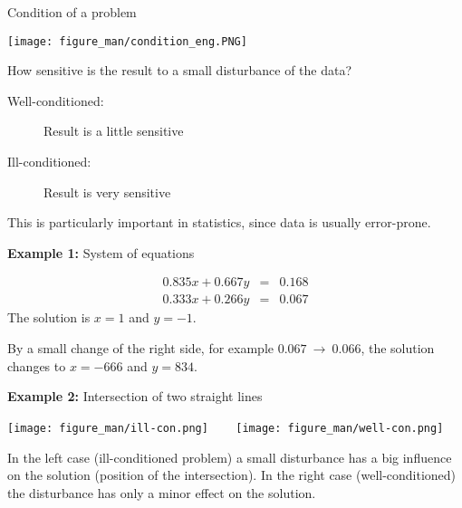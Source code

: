 \documentclass[11pt,compress,t,notes=noshow, xcolor=table]{beamer}
\begin{document}
\begin{vbframe}{Condition of a problem}

\begin{center}
\texttt{[image: figure\_man/condition\_eng.PNG]}
\end{center}

How sensitive is the result to a small disturbance of the data?

\begin{description}
 \item[Well-conditioned:] Result is a little sensitive
 \item[Ill-conditioned:] Result is very sensitive
\end{description}

This is particularly important in statistics, since data is usually error-prone.

%
%
%

\framebreak

\textbf{Example 1: }System of equations

\begin{eqnarray*}
0.835x + 0.667y &=& 0.168 \\
0.333x + 0.266y &=& 0.067
\end{eqnarray*}
The solution is $x = 1$ and $y = -1$.

\lz

By a small change of the right side, for example $0.067~\to~0.066$, the solution changes to
$x = -666$ and $y = 834$.

\framebreak

\textbf{Example 2: }Intersection of two straight lines

\begin{center}

\texttt{[image: figure\_man/ill-con.png]} ~~~ \texttt{[image: figure\_man/well-con.png]}

\end{center}

\vspace{0.2cm}

\begin{footnotesize}
In the left case (ill-conditioned problem) a small disturbance has a big influence on the solution (position of the intersection).
In the right case (well-conditioned) the disturbance has only a minor effect on the solution.
\end{footnotesize}

\end{vbframe}
\end{document}
